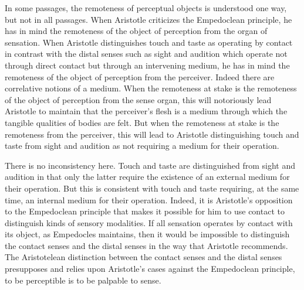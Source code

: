 In some passages, the remoteness of perceptual objects is understood one way, but not in all passages. When Aristotle criticizes the Empedoclean principle, he has in mind the remoteness of the object of perception from the organ of sensation. When Aristotle distinguishes touch and taste as operating by contact in contrast with the distal senses such as sight and audition which operate not through direct contact but through an intervening medium, he has in mind the remoteness of the object of perception from the perceiver. Indeed there are correlative notions of a medium. When the remoteness at stake is the remoteness of the object of perception from the sense organ, this will notoriously lead Aristotle to maintain that the perceiver's flesh is a medium through which the tangible qualities of bodies are felt. But when the remoteness at stake is the remoteness from the perceiver, this will lead to Aristotle distinguishing touch and taste from sight and audition as not requiring a medium for their operation. 

There is no inconsistency here. Touch and taste are distinguished from sight and audition in that only the latter require the existence of an external medium for their operation. But this is consistent with touch and taste requiring, at the same time, an internal medium for their operation. Indeed, it is Aristotle's opposition to the Empedoclean principle that makes it possible for him to use contact to distinguish kinds of sensory modalities. If all sensation operates by contact with its object, as Empedocles maintains, then it would be impossible to distinguish the contact senses and the distal senses in the way that Aristotle recommends. The Aristotelean distinction between the contact senses and the distal senses presupposes and relies upon Aristotle's cases against the Empedoclean principle, to be perceptible is to be palpable to sense.

